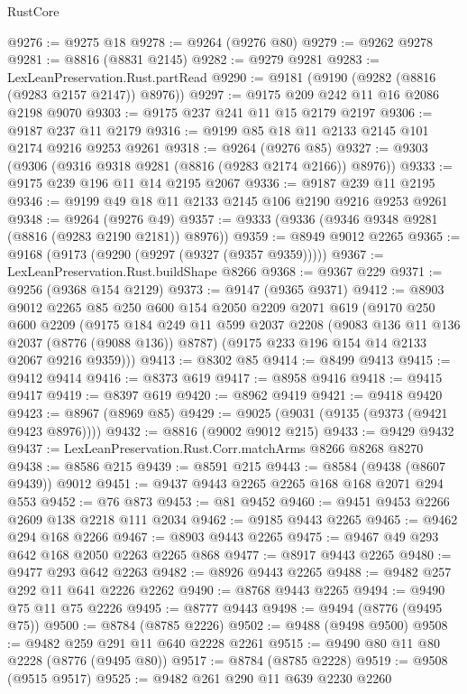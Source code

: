 \begin{lexlean}{RustCore}
\begin{coremodule}
@9276 := @9275 @18
@9278 := @9264 (@9276 @80)
@9279 := @9262 @9278
@9281 := @8816 (@8831 @2145)
@9282 := @9279 @9281
@9283 := LexLeanPreservation.Rust.partRead
@9290 := @9181 (@9190 (@9282 (@8816 (@9283 @2157 @2147)) @8976))
@9297 := @9175 @209 @242 @11 @16 @2086 @2198 @9070
@9303 := @9175 @237 @241 @11 @15 @2179 @2197
@9306 := @9187 @237 @11 @2179
@9316 := @9199 @85 @18 @11 @2133 @2145 @101 @2174 @9216 @9253 @9261
@9318 := @9264 (@9276 @85)
@9327 := @9303 (@9306 (@9316 @9318 @9281 (@8816 (@9283 @2174 @2166)) @8976))
@9333 := @9175 @239 @196 @11 @14 @2195 @2067
@9336 := @9187 @239 @11 @2195
@9346 := @9199 @49 @18 @11 @2133 @2145 @106 @2190 @9216 @9253 @9261
@9348 := @9264 (@9276 @49)
@9357 := @9333 (@9336 (@9346 @9348 @9281 (@8816 (@9283 @2190 @2181)) @8976))
@9359 := @8949 @9012 @2265
@9365 := @9168 (@9173 (@9290 (@9297 (@9327 (@9357 @9359)))))
@9367 := LexLeanPreservation.Rust.buildShape @8266
@9368 := @9367 @229
@9371 := @9256 (@9368 @154 @2129)
@9373 := @9147 (@9365 @9371)
@9412 := @8903
    @9012
    @2265
    @85
    @250
    @600
    @154
    @2050
    @2209
    @2071
    @619
    (@9170
      @250
      @600
      @2209
      (@9175
        @184
        @249
        @11
        @599
        @2037
        @2208
        (@9083 @136 @11 @136 @2037 (@8776 (@9088 @136)) @8787)
        (@9175 @233 @196 @154 @14 @2133 @2067 @9216 @9359)))
@9413 := @8302 @85
@9414 := @8499 @9413
@9415 := @9412 @9414
@9416 := @8373 @619
@9417 := @8958 @9416
@9418 := @9415 @9417
@9419 := @8397 @619
@9420 := @8962 @9419
@9421 := @9418 @9420
@9423 := @8967 (@8969 @85)
@9429 := @9025 (@9031 (@9135 (@9373 (@9421 @9423 @8976))))
@9432 := @8816 (@9002 @9012 @215)
@9433 := @9429 @9432
@9437 := LexLeanPreservation.Rust.Corr.matchArms @8266 @8268 @8270
@9438 := @8586 @215
@9439 := @8591 @215
@9443 := @8584 (@9438 (@8607 @9439)) @9012
@9451 := @9437 @9443 @2265 @2265 @168 @168 @2071 @294 @553
@9452 := @76 @873
@9453 := @81 @9452
@9460 := @9451 @9453 @2266 @2609 @138 @2218 @111 @2034
@9462 := @9185 @9443 @2265
@9465 := @9462 @294 @168 @2266
@9467 := @8903 @9443 @2265
@9475 := @9467 @49 @293 @642 @168 @2050 @2263 @2265 @868
@9477 := @8917 @9443 @2265
@9480 := @9477 @293 @642 @2263
@9482 := @8926 @9443 @2265
@9488 := @9482 @257 @292 @11 @641 @2226 @2262
@9490 := @8768 @9443 @2265
@9494 := @9490 @75 @11 @75 @2226
@9495 := @8777 @9443
@9498 := @9494 (@8776 (@9495 @75))
@9500 := @8784 (@8785 @2226)
@9502 := @9488 (@9498 @9500)
@9508 := @9482 @259 @291 @11 @640 @2228 @2261
@9515 := @9490 @80 @11 @80 @2228 (@8776 (@9495 @80))
@9517 := @8784 (@8785 @2228)
@9519 := @9508 (@9515 @9517)
@9525 := @9482 @261 @290 @11 @639 @2230 @2260

\end{coremodule}
\end{lexlean}
